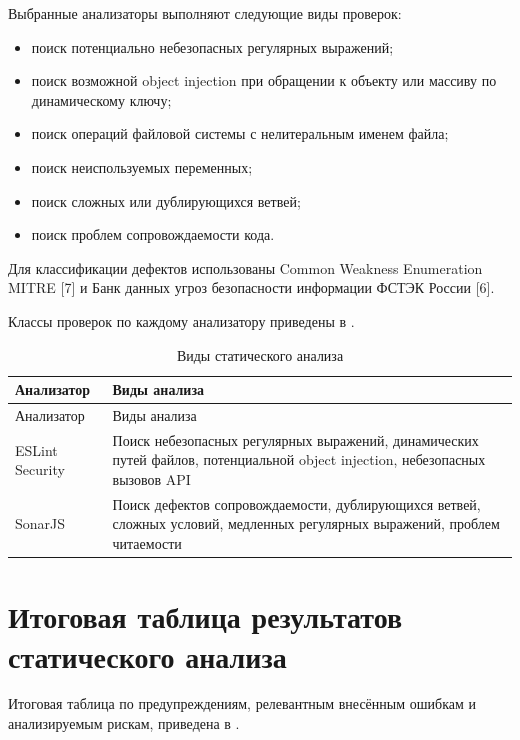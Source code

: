 Выбранные анализаторы выполняют следующие виды проверок:
\begin{itemize}
    \item поиск потенциально небезопасных регулярных выражений;
    \item поиск возможной object injection при обращении к объекту или массиву по динамическому ключу;
    \item поиск операций файловой системы с нелитеральным именем файла;
    \item поиск неиспользуемых переменных;
    \item поиск сложных или дублирующихся ветвей;
    \item поиск проблем сопровождаемости кода.
\end{itemize}

Для классификации дефектов использованы Common Weakness Enumeration MITRE [7]
и Банк данных угроз безопасности информации ФСТЭК России [6].

Классы проверок по каждому анализатору приведены в .

\noindent
\begingroup
\centering
\small
\begin{longtable}[c]{|p{4cm}|p{10.5cm}|}
    \caption{Виды статического анализа}
    \label{tab:analysis-types}
    \\
    \hline
    Анализатор & Виды анализа \\ \hline
    \endfirsthead
    \hline
    Анализатор & Виды анализа \\ \hline
    \endhead
    \hline
    ESLint Security & Поиск небезопасных регулярных выражений, динамических путей файлов, потенциальной object injection, небезопасных вызовов API \\ \hline
    SonarJS & Поиск дефектов сопровождаемости, дублирующихся ветвей, сложных условий, медленных регулярных выражений, проблем читаемости \\ \hline
\end{longtable}
\normalsize
\endgroup

\section{Итоговая таблица результатов статического анализа} \label{ch3:sec4}

Итоговая таблица по предупреждениям, релевантным внесённым ошибкам и анализируемым
рискам, приведена в .

